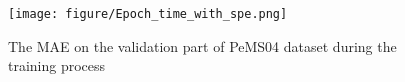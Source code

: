 \begin{figure}
    \centering
    \texttt{[image: figure/Epoch\_time\_with\_spe.png]}
    \vspace{-3mm}
    \caption{The MAE on the validation part of PeMS04 dataset during the training process}
    \vspace{-6mm}
    \label{fig:epoch}
\end{figure}